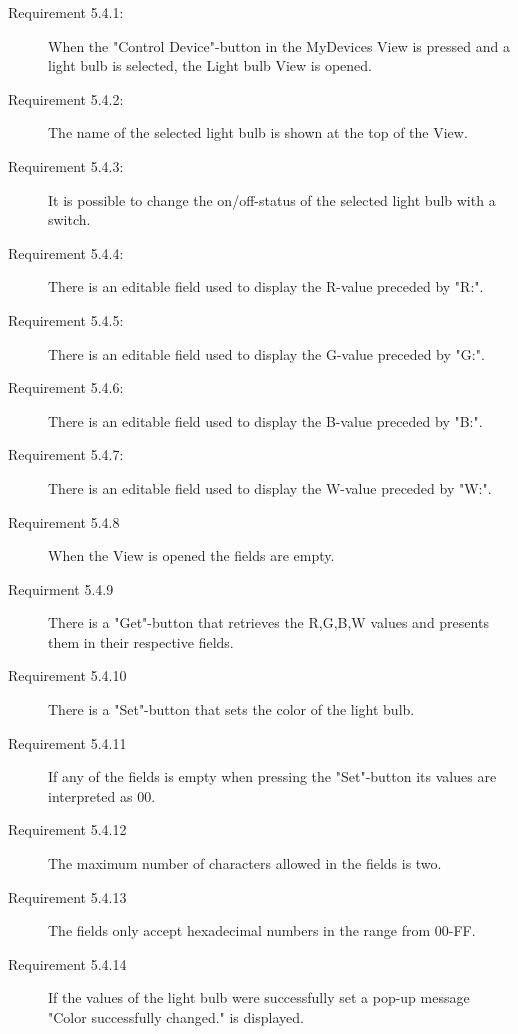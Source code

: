 \documentclass[a4paper]{article}
\begin{document}
\begin{description}
\item[Requirement 5.4.1:] When the "Control Device"-button in the MyDevices View is pressed and a light bulb is selected, the Light bulb View is opened.  

\item[Requirement 5.4.2:] The name of the selected light bulb is shown at the top of the View.

\item[Requirement 5.4.3:] It is possible to change the on/off-status of the selected light bulb with a switch.

\item[Requirement 5.4.4:] There is an editable field used to display the R-value preceded by "R:".

\item[Requirement 5.4.5:] There is an editable field used to display the G-value preceded by "G:".

\item[Requirement 5.4.6:] There is an editable field used to display the B-value preceded by "B:".

\item[Requirement 5.4.7:] There is an editable field used to display the W-value preceded by "W:".

\item[Requirement 5.4.8] When the View is opened the fields are empty.

\item[Requirment 5.4.9] There is a "Get"-button that retrieves the R,G,B,W values and presents them in their respective fields.

\item[Requirement 5.4.10] There is a "Set"-button that sets the color of the light bulb.

\item[Requirement 5.4.11] If any of the fields is empty when pressing the "Set"-button its values are interpreted as 00.

\item[Requirement 5.4.12] The maximum number of characters allowed in the fields is two.

\item[Requirement 5.4.13] The fields only accept hexadecimal numbers in the range from 00-FF.

\item[Requirement 5.4.14] If the values of the light bulb were successfully set a pop-up message "Color successfully changed." is displayed.


\end{description}
\end{document}
